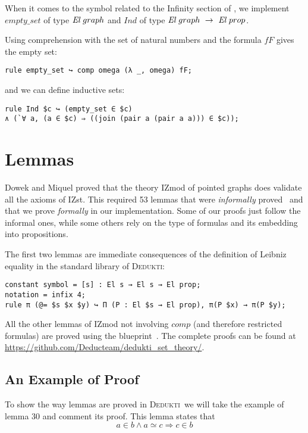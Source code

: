 \documentclass[submission,copyright,creativecommons]{eptcs}
\def\ra{\rightarrow}
\def\El{{\mbox{\it El}}}
\def\imp{\mathbin{\Rightarrow}}
\def\conj{\mathbin{\wedge}}
\newcommand{\dedukti}{\textsc{Dedukti}}
\begin{document}
When it comes to the symbol related to the Infinity section of \cite[see Section 2.1]{zermodulo}, we implement $empty\_set$ of type $\El~graph$ and $Ind$ of type $\El~graph \ \ra \ \El~prop$.

Using comprehension with the set of natural numbers and the formula $fF$ gives the empty set:
\begin{lstlisting}
rule empty_set ↪ comp omega (λ _, omega) fF;
\end{lstlisting}

and we can define inductive sets:

\begin{lstlisting}
rule Ind $c ↪ (empty_set ∈ $c) 
∧ (`∀ a, (a ∈ $c) ⇒ ((join (pair a (pair a a))) ∈ $c));
\end{lstlisting}

\section{Lemmas}

Dowek and Miquel proved that the theory IZmod of pointed graphs does validate all the axioms of IZst. This required 53 lemmas that were \textit{informally} proved~\cite[see Tables 4 and 5]{zermodulo} and that we prove \textit{formally} in our implementation. Some of our proofs just follow the informal ones, while some others rely on the type of formulas and its embedding into propositions. 

The first two lemmas are immediate consequences of the definition of Leibniz equality in the standard library of \dedukti:
\begin{lstlisting}
constant symbol = [s] : El s → El s → El prop;
notation = infix 4;
rule π (@= $s $x $y) ↪ Π (P : El $s → El prop), π(P $x) → π(P $y);
\end{lstlisting}

All the other lemmas of IZmod not involving $comp$ (and therefore restricted formulas) are proved using the blueprint~\cite[see Proposition 1]{zermodulo53}. The complete proofs can be found at \url{https://github.com/Deducteam/dedukti_set_theory/}.

\subsection{An Example of Proof}

To show the way lemmas are proved in \dedukti ~we will take the example of lemma 30 and comment its proof. This lemma states that $$ a \in b \conj a \simeq c \imp c \in b $$
\end{document}
